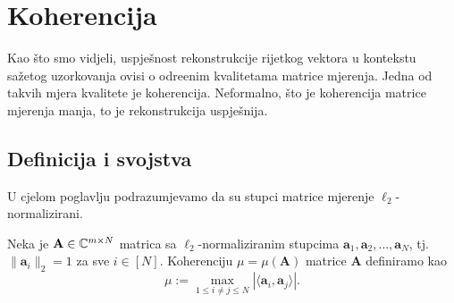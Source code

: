 \documentclass[a4paper,twoside,12pt]{memoir} %
\newcommand{\vect}[1]{\mathbf{#1}}
\renewcommand{\vec}{\vect}
\newcommand{\norm}[1]{\|{#1}\|}
\begin{document}
\chapter[Koherencija][Koherencija]{Koherencija}
Kao \v{s}to smo vidjeli, uspje\v{s}nost rekonstrukcije rijetkog vektora u kontekstu sa\v{z}etog uzorkovanja ovisi o odre\dj enim kvalitetama matrice mjerenja. Jedna od takvih mjera kvalitete je koherencija. Neformalno, \v{s}to je koherencija matrice mjerenja manja, to je rekonstrukcija uspje\v{s}nija.  

\section[Definicija i svojstva][Definicija i svojstva]{Definicija i svojstva}
U cjelom poglavlju podrazumjevamo da su stupci matrice mjerenje $\ell_2$-normalizirani.
\begin{defn}
    Neka je $\vec A \in \C^{m \times N}$ matrica sa $\ell_2$-normaliziranim stupcima $\vec a_1, \vec a_2, \dots, \vec a_N$, tj. $\norm{\vec a_i}_2 = 1$ za sve $i \in [N]$. Koherenciju $\mu = \mu(\vec A)$ matrice $\vec A$ definiramo kao
    \begin{equation}\label{5:1}
        \mu := \max_{1 \leq i \neq j \leq N} |\langle \vec a_i, \vec a_j \rangle| .
    \end{equation}
\end{defn}
\end{document}
